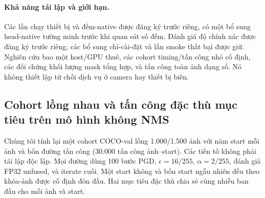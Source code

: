 \paragraph{Khả năng tái lập và giới hạn.} Các lần chạy thiết bị và đếm-native được đăng ký trước riêng, có một bổ sung head-native tường minh trước khi quan sát số đếm. Đánh giá độ chính xác được đăng ký trước riêng; các bổ sung chỉ-cài-đặt và lần smoke thất bại được giữ. Nghiên cứu bao một host/GPU thuê, các cohort timing/tấn công nhỏ cố định, các đối chứng khối lượng mask tổng hợp, và tấn công toàn ảnh dạng số. Nó không thiết lập từ chối dịch vụ ở camera hay thiết bị biên.

\subsection{Cohort lồng nhau và tấn công đặc thù mục tiêu trên mô hình không NMS}
\label{sec:nested1500}
Chúng tôi tính lại một cohort COCO-val lồng 1.000/1.500 ảnh với năm start mỗi ảnh và bốn đường tấn công (30.000 tấn công ảnh--start). Các tiền tố không phải tái lập độc lập. Mọi đường dùng 100 bước PGD, $\epsilon=16/255$, $\alpha=2/255$, đánh giá FP32 unfused, và iterate cuối. Một start không và bốn start ngẫu nhiên đều theo khóa-ảnh được cố định đón đầu. Hai mục tiêu đặc thù chia sẻ cùng nhiễu ban đầu cho mỗi ảnh và start.
